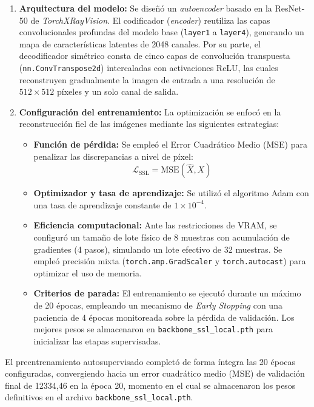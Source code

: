 \documentclass[../main.tex]{subfiles}
\begin{document}
\begin{enumerate}
    \item \textbf{Arquitectura del modelo:} Se diseñó un \textit{autoencoder} basado en la ResNet-50 de \textit{TorchXRayVision}. El codificador (\textit{encoder}) reutiliza las capas convolucionales profundas del modelo base (\texttt{layer1} a \texttt{layer4}), generando un mapa de características latentes de 2048 canales. Por su parte, el decodificador simétrico consta de cinco capas de convolución transpuesta (\texttt{nn.ConvTranspose2d}) intercaladas con activaciones ReLU, las cuales reconstruyen gradualmente la imagen de entrada a una resolución de $512 \times 512$ píxeles y un solo canal de salida.

    \item \textbf{Configuración del entrenamiento:} La optimización se enfocó en la reconstrucción fiel de las imágenes mediante las siguientes estrategias:
    \begin{itemize}
        \item \textbf{Función de pérdida:} Se empleó el Error Cuadrático Medio (MSE) para penalizar las discrepancias a nivel de píxel:
        $$\mathcal{L}_{\text{SSL}} = \text{MSE}(\hat{X}, X)$$
        \item \textbf{Optimizador y tasa de aprendizaje:} Se utilizó el algoritmo Adam con una tasa de aprendizaje constante de $1 \times 10^{-4}$.
        \item \textbf{Eficiencia computacional:} Ante las restricciones de VRAM, se configuró un tamaño de lote físico de 8 muestras con acumulación de gradientes (4 pasos), simulando un lote efectivo de 32 muestras. Se empleó precisión mixta (\texttt{torch.amp.GradScaler} y \texttt{torch.autocast}) para optimizar el uso de memoria.
        \item \textbf{Criterios de parada:} El entrenamiento se ejecutó durante un máximo de 20 épocas, empleando un mecanismo de \textit{Early Stopping} con una paciencia de 4 épocas monitoreada sobre la pérdida de validación. Los mejores pesos se almacenaron en \texttt{backbone\_ssl\_local.pth} para inicializar las etapas supervisadas.
    \end{itemize}
\end{enumerate}

El preentrenamiento autosupervisado completó de forma íntegra las 20 épocas configuradas, convergiendo hacia un error cuadrático medio (MSE) de validación final de 12334,46 en la época 20, momento en el cual se almacenaron los pesos definitivos en el archivo \texttt{backbone\_ssl\_local.pth}.
\end{document}
